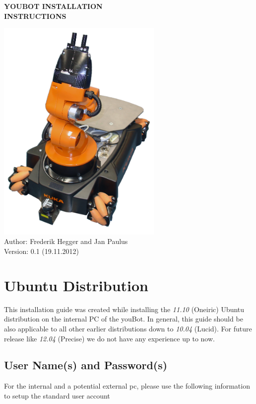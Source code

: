 \documentclass[a4paper,12pt]{article}
\begin{document}
\begin{center}
	\Huge
	\textbf{YOUBOT INSTALLATION}\\
	\textbf{INSTRUCTIONS}\\
	\vspace{3 cm} 

	\includegraphics[width=0.60\textwidth]{gfx/youbot.png}
	\textbf{}\\
	\vspace{3 cm} 
	\normalsize
	Author: Frederik Hegger and Jan Paulus\\
    Version: 0.1 (19.11.2012)\\
    
	
\end{center}
\newpage

\tableofcontents 
\newpage

\section{Ubuntu Distribution}
This installation guide was created while installing the \textit{11.10} (Oneiric) Ubuntu distribution on the internal PC of the youBot. In general, this guide should be also applicable to all other earlier distributions down to \textit{10.04} (Lucid). For future release like \textit{12.04} (Precise) we do not have any experience up to now.

\subsection{User Name(s) and Password(s)}
For the internal and a potential external pc, please use the following information to setup the standard user account
	
\end{document}
